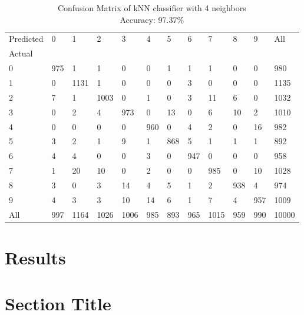 \begin{table}[H]
    \centering
    \begin{tabular}{llllllllllll}

        Predicted & 0 & 1  & 2 & 3  & 4  & 5 & 6  & 7  & 8 & 9  & All \\
        Actual &      &       &       &       &      &      &      &       &      &      &        \\
        0      &  975 &     1 &     1 &     0 &    0 &    1 &    1 &     1 &    0 &    0 &    980 \\
        1      &    0 &  1131 &     1 &     0 &    0 &    0 &    3 &     0 &    0 &    0 &   1135 \\
        2      &    7 &     1 &  1003 &     0 &    1 &    0 &    3 &    11 &    6 &    0 &   1032 \\
        3      &    0 &     2 &     4 &   973 &    0 &   13 &    0 &     6 &   10 &    2 &   1010 \\
        4      &    0 &     0 &     0 &     0 &  960 &    0 &    4 &     2 &    0 &   16 &    982 \\
        5      &    3 &     2 &     1 &     9 &    1 &  868 &    5 &     1 &    1 &    1 &    892 \\
        6      &    4 &     4 &     0 &     0 &    3 &    0 &  947 &     0 &    0 &    0 &    958 \\
        7      &    1 &    20 &    10 &     0 &    2 &    0 &    0 &   985 &    0 &   10 &   1028 \\
        8      &    3 &     0 &     3 &    14 &    4 &    5 &    1 &     2 &  938 &    4 &    974 \\
        9      &    4 &     3 &     3 &    10 &   14 &    6 &    1 &     7 &    4 &  957 &   1009 \\
        All    &  997 &  1164 &  1026 &  1006 &  985 &  893 &  965 &  1015 &  959 &  990 &  10000 \\

    \end{tabular}
    \caption*{Confusion Matrix of kNN classifier with 4 neighbors\\
    Accuracy: 97.37\%}
\end{table}




\section*{Results}

\lipsum[1-3]

\section*{Section Title}
\lipsum[1-2]

